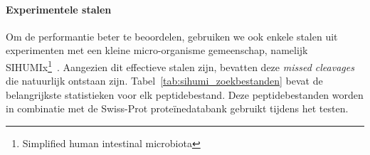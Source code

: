 \paragraph{Experimentele stalen}
Om de performantie beter te beoordelen, gebruiken we ook enkele stalen uit experimenten met een kleine micro-organisme gemeenschap, namelijk SIHUMIx\footnote{Simplified human intestinal microbiota}~\cite{SIHUMI_first_introduction, SIHUMI_frequently_used}.
Aangezien dit effectieve stalen zijn, bevatten deze \textit{missed cleavages} die natuurlijk ontstaan zijn.
Tabel~\ref{tab:sihumi_zoekbestanden} bevat de belangrijkste statistieken voor elk peptidebestand.
Deze peptidebestanden worden in combinatie met de Swiss-Prot proteïnedatabank gebruikt tijdens het testen.

\begin{table}[H]
    \begin{minipage}{\linewidth}
        \centering
\end{minipage}
\end{table}
